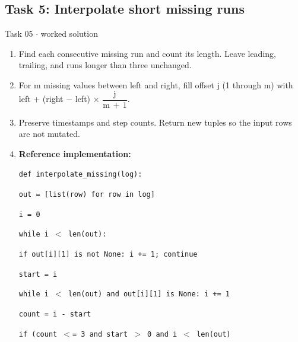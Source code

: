 \documentclass[11pt]{article}
\begin{document}
\begin{keepsection}\subsection{Task 5: Interpolate short missing runs}

\begin{workedbox}{Task 05 \ensuremath{\cdot} worked solution}
\begin{enumerate}
\item Find each consecutive missing run and count its length. Leave leading, trailing, and runs longer than three unchanged.
\item For m missing values between left and right, fill offset j (1 through m) with left + (right \ensuremath{-} left) \ensuremath{\times} {\small\ensuremath{\dfrac{\mathrm{j}}{\mathrm{m}\, +\, 1}}}.
\item Preserve timestamps and step counts. Return new tuples so the input rows are not mutated.
\item {}
\textbf{Reference implementation:}
\begin{tcolorbox}[colback=Paperblue,colframe=Paperblue,boxrule=0pt,arc=0pt,left=7pt,right=7pt,top=5pt,bottom=5pt]\small\sloppy
\noindent\hspace*{0em}\texttt{def interpolate\_missing(log):}\par
\noindent\hspace*{1em}\texttt{out = [list(row) for row in log]}\par
\noindent\hspace*{1em}\texttt{i = 0}\par
\noindent\hspace*{1em}\texttt{while i \ensuremath{<} len(out):}\par
\noindent\hspace*{3em}\texttt{if out[i][1] is not None: i += 1; continue}\par
\noindent\hspace*{3em}\texttt{start = i}\par
\noindent\hspace*{3em}\texttt{while i \ensuremath{<} len(out) and out[i][1] is None: i += 1}\par
\noindent\hspace*{3em}\texttt{count = i - start}\par
\noindent\hspace*{3em}\texttt{if (count \ensuremath{<}= 3 and start \ensuremath{>} 0 and i \ensuremath{<} len(out)}\par

\end{tcolorbox}
\end{enumerate}
\end{workedbox}
\end{keepsection}
\end{document}
